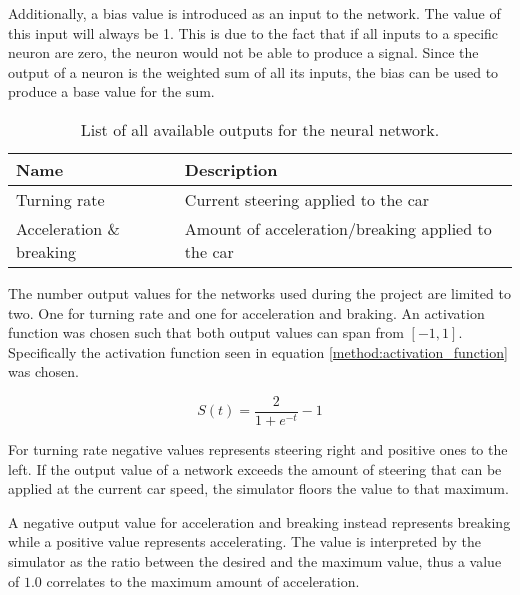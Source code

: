Additionally, a bias value is introduced as an input to the network. The value of this input will always be 1. This is due to the fact that if all inputs to a specific neuron are zero, the neuron would not be able to produce a signal. Since the output of a neuron is the weighted sum of all its inputs, the bias can be used to produce a base value for the sum. 

\begin{table}[h!] 
  \centering
  \begin{tabular}{ll}
    \toprule
    Name & Description\\
    \midrule
    Turning rate & Current steering applied to the car \\
    Acceleration \& breaking & Amount of acceleration/breaking applied to the car \\
    \bottomrule
  \end{tabular}
  \caption{List of all available outputs for the neural network.}
  \label{tab:output_table}
\end{table}

\noindent
The number output values for the networks used during the project are limited to two. One for turning rate and one for acceleration and braking. An activation function was chosen such that both output values can span from $[-1,1]$. Specifically the activation function seen in equation \ref{method:activation_function} was chosen.

\begin{equation}
\label{method:activation_function}
    S(t) = \frac{2}{1 + e^{-t}} - 1
\end{equation}

\noindent
For turning rate negative values represents steering right and positive ones to the left. If the output value of a network exceeds the amount of steering that can be applied at the current car speed, the simulator floors the value to that maximum.

A negative output value for acceleration and breaking instead represents breaking while a positive value represents accelerating. The value is interpreted by the simulator as the ratio between the desired and the maximum value, thus a value of $1.0$ correlates to the maximum amount of acceleration.


